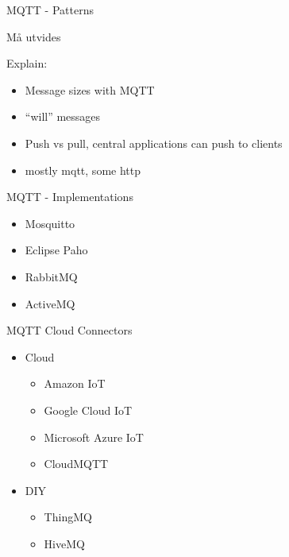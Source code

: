 \begin{frame}{MQTT - Patterns}
\protect\hypertarget{mqtt---patterns}{}

Må utvides

Explain:

\begin{itemize}
\tightlist
\item
  Message sizes with MQTT
\item
  “will” messages
\item
  Push vs pull, central applications can push to clients
\item
  mostly mqtt, some http
\end{itemize}

\end{frame}

\begin{frame}{MQTT - Implementations}
\protect\hypertarget{mqtt---implementations}{}

\begin{itemize}
\tightlist
\item
  Mosquitto
\item
  Eclipse Paho
\item
  RabbitMQ
\item
  ActiveMQ
\end{itemize}


\end{frame}

\begin{frame}{MQTT Cloud Connectors}
\protect\hypertarget{mqtt-cloud-connectors}{}

\begin{itemize}
\tightlist
\item
  Cloud

  \begin{itemize}
  \tightlist
  \item
    Amazon IoT
  \item
    Google Cloud IoT
  \item
    Microsoft Azure IoT
  \item
    CloudMQTT
  \end{itemize}
\item
  DIY

  \begin{itemize}
  \tightlist
  \item
    ThingMQ
  \item
    HiveMQ
  \end{itemize}
\end{itemize}


\end{frame}

